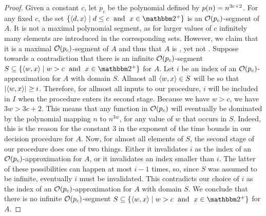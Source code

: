\begin{proof}
  Given a constant $c$, let $p_c$ be the polynomial defined by $p(n) = n^{3c + 2}$.
  For any fixed $c$, the set $\{\pair{d}{x} \st d \le c \reland x \in \binary^+\}$ is an $\operatorname{\mathcal{O}}(p_c)$-segment of $A$.
  It is not a maximal polynomial segment, as for larger values of $c$ infinitely many elements are introduced in the corresponding sets.
  However, we claim that it is a maximal $\operatorname{\mathcal{O}}(p_c)$-segment of $A$ and thus that $A$ is , yet not .
  Suppose towards a contradiction that there is an infinite $\operatorname{\mathcal{O}}(p_c)$-segment $S \subseteq \{\pair{w}{x} \st w > c \reland x \in \binary^+\}$ for $A$.
  Let $i$ be an index of an $\operatorname{\mathcal{O}}(p_c)$-approximation for $A$ with domain $S$.
  Allmost all ${\langle w, x\rangle} \in S$ will be so that ${\lvert{\langle w, x\rangle}\rvert} \ge i$.
  Therefore, for allmost all inputs to our procedure, $i$ will be included in $I$ when the procedure enters its second stage.
  Because we have $w > c$, we have $3w > 3c + 2$.
  This means that any function in $\operatorname{\mathcal{O}}(p_c)$ will eventually be dominated by the polynomial mapping $n$ to $n^{3w}$, for any value of $w$ that occurs in $S$.
  Indeed, this is the reason for the constant $3$ in the exponent of the time bounds in our decision procedure for $A$.
  Now, for almost all elements of $S$, the second stage of our procedure does one of two things.
  Either it invalidates $i$ as the index of an $\operatorname{\mathcal{O}}(p_c)$-approximation for $A$, or it invalidates an index smaller than $i$.
  The latter of these possibilities can happen at most $i - 1$ times, so, since $S$ was assumed to be infinite, eventually $i$ must be invalidated.
  This contradicts our choice of $i$ as the index of an $\operatorname{\mathcal{O}}(p_c)$-approximation for $A$ with domain $S$.
  We conclude that there is no infinite $\operatorname{\mathcal{O}}(p_c)$-segment $S \subseteq \{\pair{w}{x} \st w > c \reland x \in \binary^+\}$ for $A$.
\end{proof}

